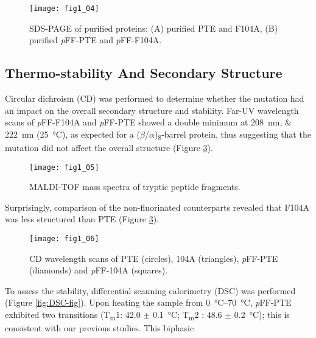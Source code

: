 \begin{refsection}
\begin{figure}[h!] \centering \texttt{[image: fig1\_04]}
    \caption[SDS-PAGE of purified proteins: (A) purified PTE and F104A, (B)
    purified \emph{p}FF-PTE and \emph{p}FF-F104A.]{SDS-PAGE of purified
        proteins: (A) purified PTE and F104A, (B) purified \emph{p}FF-PTE and
        \emph{p}FF-F104A.} \label{fig:sds-gel} 
\end{figure}

\subsection{Thermo-stability And Secondary Structure}

Circular dichroism (CD) was performed to determine whether the mutation had an
impact on the overall secondary structure and stability. Far-UV wavelength
scans of \emph{p}FF-F104A and \emph{p}FF-PTE showed a double minimum at
\SIlist{208;222}{\nm} (\SI{25}{\celsius}), as expected for a
($\beta$/$\alpha$)\textsubscript{8}-barrel protein, thus suggesting that the
mutation did not affect the overall structure (Figure \ref{fig:CD-fig}).  
\begin{figure}[h!] \centering \texttt{[image: fig1\_05]}
    \caption[MALDI-TOF mass spectra of tryptic peptide fragments.]{MALDI-TOF
    mass spectra of tryptic peptide fragments.} \label{fig:MALDI-fig} 
\end{figure}
Surprisingly, comparison of the non-fluorinated counterparts revealed that
F104A was less structured than PTE (Figure \ref{fig:CD-fig}). 
\begin{figure}[h!] \centering \texttt{[image: fig1\_06]}
    \caption[CD wavelength scans of PTE (circles), 104A (triangles),
    \emph{p}FF-PTE (diamonds) and \emph{p}FF-104A (squares).]{CD wavelength
        scans of PTE (circles), 104A (triangles), \emph{p}FF-PTE (diamonds) and
        \emph{p}FF-104A (squares).} \label{fig:CD-fig} 
\end{figure}
To assess the stability, differential scanning calorimetry (DSC) was performed
(Figure \ref{fig:DSC-fig}). Upon heating the sample from \SIrange{0}{70}{\celsius},
\emph{p}FF-PTE exhibited two transitions (T\textsubscript{m}1: 42.0 $\pm$
\SI{0.1}{\celsius}; T\textsubscript{m}2 : 48.6 $\pm$ \SI{0.2}{\celsius}); this
is consistent with our previous studies.\cite{Baker2011b} This biphasic

\end{refsection}
